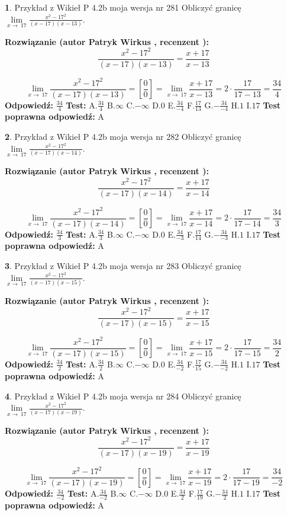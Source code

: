 \documentclass[12pt, a4paper]{article}
\theoremstyle{definition} %
\newtheorem{zad}{}
\newcommand{\zadStart}[1]{\begin{zad}#1\newline}
\newcommand{\zadStop}{\end{zad}}
\newcommand{\rozwStart}[2]{\noindent \textbf{Rozwiązanie (autor #1 , recenzent #2): }\newline}
\newcommand{\rozwStop}{\newline}
\newcommand{\odpStart}{\noindent \textbf{Odpowiedź:}\newline}
\newcommand{\odpStop}{\newline}
\newcommand{\testStart}{\noindent \textbf{Test:}\newline}
\newcommand{\testStop}{\newline}
\newcommand{\kluczStart}{\noindent \textbf{Test poprawna odpowiedź:}\newline}
\newcommand{\kluczStop}{\newline}
\begin{document}
\zadStart{Przykład z Wikieł P 4.2b moja wersja nr 281}
Obliczyć granicę $\lim\limits_{x\to\ 17}\frac{x^{2}-17^{2}}{(x-17)(x-13)}$.
\zadStop
\rozwStart{Patryk Wirkus}{}
$$\frac{x^{2}-17^{2}}{(x-17)(x-13)}=\frac{x+17}{x-13}$$

$$\lim\limits_{x\to\ 17}\frac{x^{2}-17^{2}}{(x-17)(x-13)}=[\frac{0}{0}]=\lim\limits_{x\to\ 17}\frac{x+17}{x-13}=2 \cdot \frac{17}{17-13} = \frac{34}{4}$$
\rozwStop
\odpStart
$\frac{34}{4}$
\odpStop
\testStart
A.$\frac{34}{4}$
B.$\infty$
C.$-\infty$
D.$0$
E.$\frac{34}{-4}$
F.$\frac{17}{13}$
G.$-\frac{34}{-4}$
H.$1$
I.$17$
\testStop
\kluczStart
A
\kluczStop



\zadStart{Przykład z Wikieł P 4.2b moja wersja nr 282}
Obliczyć granicę $\lim\limits_{x\to\ 17}\frac{x^{2}-17^{2}}{(x-17)(x-14)}$.
\zadStop
\rozwStart{Patryk Wirkus}{}
$$\frac{x^{2}-17^{2}}{(x-17)(x-14)}=\frac{x+17}{x-14}$$

$$\lim\limits_{x\to\ 17}\frac{x^{2}-17^{2}}{(x-17)(x-14)}=[\frac{0}{0}]=\lim\limits_{x\to\ 17}\frac{x+17}{x-14}=2 \cdot \frac{17}{17-14} = \frac{34}{3}$$
\rozwStop
\odpStart
$\frac{34}{3}$
\odpStop
\testStart
A.$\frac{34}{3}$
B.$\infty$
C.$-\infty$
D.$0$
E.$\frac{34}{-3}$
F.$\frac{17}{14}$
G.$-\frac{34}{-3}$
H.$1$
I.$17$
\testStop
\kluczStart
A
\kluczStop



\zadStart{Przykład z Wikieł P 4.2b moja wersja nr 283}
Obliczyć granicę $\lim\limits_{x\to\ 17}\frac{x^{2}-17^{2}}{(x-17)(x-15)}$.
\zadStop
\rozwStart{Patryk Wirkus}{}
$$\frac{x^{2}-17^{2}}{(x-17)(x-15)}=\frac{x+17}{x-15}$$

$$\lim\limits_{x\to\ 17}\frac{x^{2}-17^{2}}{(x-17)(x-15)}=[\frac{0}{0}]=\lim\limits_{x\to\ 17}\frac{x+17}{x-15}=2 \cdot \frac{17}{17-15} = \frac{34}{2}$$
\rozwStop
\odpStart
$\frac{34}{2}$
\odpStop
\testStart
A.$\frac{34}{2}$
B.$\infty$
C.$-\infty$
D.$0$
E.$\frac{34}{-2}$
F.$\frac{17}{15}$
G.$-\frac{34}{-2}$
H.$1$
I.$17$
\testStop
\kluczStart
A
\kluczStop



\zadStart{Przykład z Wikieł P 4.2b moja wersja nr 284}
Obliczyć granicę $\lim\limits_{x\to\ 17}\frac{x^{2}-17^{2}}{(x-17)(x-19)}$.
\zadStop
\rozwStart{Patryk Wirkus}{}
$$\frac{x^{2}-17^{2}}{(x-17)(x-19)}=\frac{x+17}{x-19}$$

$$\lim\limits_{x\to\ 17}\frac{x^{2}-17^{2}}{(x-17)(x-19)}=[\frac{0}{0}]=\lim\limits_{x\to\ 17}\frac{x+17}{x-19}=2 \cdot \frac{17}{17-19} = \frac{34}{-2}$$
\rozwStop
\odpStart
$\frac{34}{-2}$
\odpStop
\testStart
A.$\frac{34}{-2}$
B.$\infty$
C.$-\infty$
D.$0$
E.$\frac{34}{2}$
F.$\frac{17}{19}$
G.$-\frac{34}{2}$
H.$1$
I.$17$
\testStop
\kluczStart
A
\kluczStop
\end{document}
